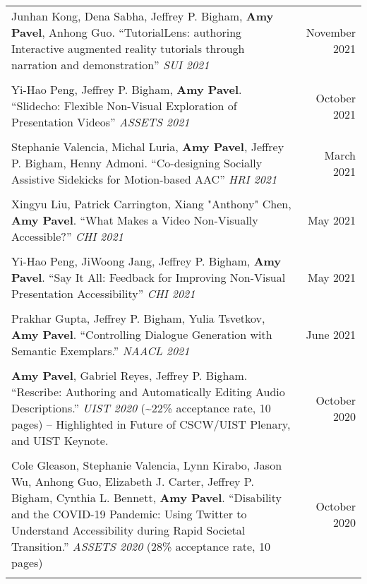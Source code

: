 \begin{longtable}{Xr}
	Junhan Kong, Dena Sabha, Jeffrey P. Bigham, \textbf{Amy Pavel}, Anhong Guo. ``TutorialLens: authoring Interactive augmented reality tutorials through narration and demonstration'' \textit{SUI 2021} & November 2021 \\
	\\

	Yi-Hao Peng, Jeffrey P. Bigham, \textbf{Amy Pavel}. ``Slidecho: Flexible Non-Visual Exploration of Presentation Videos'' \textit{ASSETS 2021} & October 2021 \\
	\\

	Stephanie Valencia, Michal Luria, \textbf{Amy Pavel}, Jeffrey P. Bigham, Henny Admoni. ``Co-designing Socially Assistive Sidekicks for Motion-based AAC'' \textit{HRI 2021} & March 2021 \\
	\\

	Xingyu Liu, Patrick Carrington, Xiang "Anthony" Chen, \textbf{Amy Pavel}. ``What Makes a Video Non-Visually Accessible?'' \textit{CHI 2021} & May 2021 \\
	\\

	Yi-Hao Peng, JiWoong Jang, Jeffrey P. Bigham, \textbf{Amy Pavel}. ``Say It All: Feedback for Improving Non-Visual Presentation Accessibility'' \textit{CHI 2021} & May 2021 \\
	\\

	Prakhar Gupta, Jeffrey P. Bigham, Yulia Tsvetkov, \textbf{Amy Pavel}. ``Controlling Dialogue Generation with Semantic Exemplars.'' \textit{NAACL 2021} & June 2021 \\
	\\

	\textbf{Amy Pavel}, Gabriel Reyes, Jeffrey P. Bigham. ``Rescribe: Authoring and Automatically Editing Audio Descriptions.'' \textit{UIST 2020} (\textasciitilde22\% acceptance rate, 10 pages) -- Highlighted in Future of CSCW/UIST Plenary, and UIST Keynote. & October 2020 \\
	\\

	Cole Gleason, Stephanie Valencia, Lynn Kirabo, Jason Wu, Anhong Guo, Elizabeth J. Carter, Jeffrey P. Bigham, Cynthia L. Bennett, \textbf{Amy Pavel}. ``Disability and the COVID-19 Pandemic: Using Twitter to Understand Accessibility during Rapid Societal Transition.'' \textit{ASSETS 2020} (28\% acceptance rate, 10 pages) & October 2020 \\
	\\


\end{longtable}
